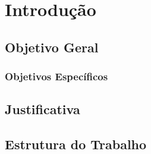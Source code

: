 \chapter{Introdução}

	\lipsum[1-1]

\section{Objetivo Geral}

	\lipsum[1-1]
\subsection{Objetivos Específicos}

	\lipsum[1-1]

\section{Justificativa}

\lipsum[1-1]
\section{Estrutura do Trabalho}

\lipsum[1-1]